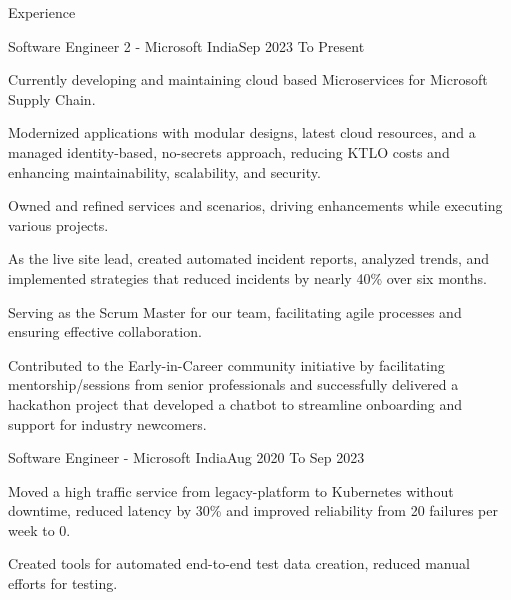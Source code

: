 \documentclass{resume} %
\begin{document}




    \begin{rSection}{Experience}

        \begin{rSubsection}{Software Engineer 2 - Microsoft India}{Sep 2023 To Present}{}{}

            \item Currently developing and maintaining cloud based Microservices for Microsoft Supply Chain.
            \item Modernized applications with modular designs, latest cloud resources, and a managed identity-based, no-secrets approach, reducing KTLO costs and enhancing maintainability, scalability, and security.
            \item Owned and refined services and scenarios, driving enhancements while executing various projects.
            \item As the live site lead, created automated incident reports, analyzed trends, and implemented strategies that reduced incidents by nearly 40\% over six months.
            \item Serving as the Scrum Master for our team, facilitating agile processes and ensuring effective collaboration.
            \item Contributed to the Early-in-Career community initiative by facilitating mentorship/sessions from senior professionals and successfully delivered a hackathon project that developed a chatbot to streamline onboarding and support for industry newcomers.

        \end{rSubsection}


        \begin{rSubsection}{Software Engineer - Microsoft India}{Aug 2020 To Sep 2023}{}{}

            \item Moved a high traffic service from legacy-platform to Kubernetes without downtime, reduced latency by 30\% and improved reliability from 20 failures per week to 0.
            \item Created tools for automated end-to-end test data creation, reduced manual efforts for testing.
            

\end{rSubsection}
\end{rSection}
\end{document}
